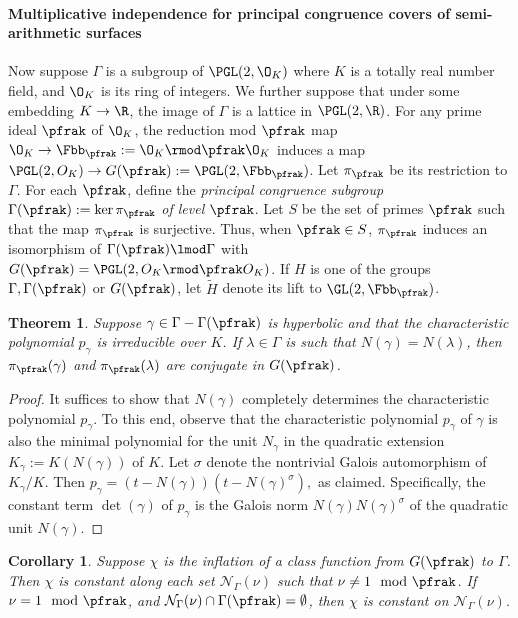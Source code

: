 \documentclass[11pt]{amsart}
\theoremstyle{definition}
\theoremstyle{plain}
\newtheorem{thm}{Theorem}
\newtheorem{corollary}{Corollary}
\theoremstyle{remark}
\begin{document}
\paragraph{Multiplicative independence for principal congruence covers of semi-arithmetic surfaces}

Now suppose $\Gamma$ is a subgroup of $\PGL(2,\O_K)$  where $K$ is a totally real number field, and $\O_K$ is its ring of integers.
We further suppose that under some embedding $K\to \R$, the image of $\Gamma$ is a lattice in $\PGL(2,\R)$.
For any prime ideal $\pfrak$ of $\O_K$, the reduction mod $\pfrak$ map $\O_K \to \Fbb_\pfrak:=\O_K \rmod \pfrak \O_K$ induces a map $\PGL(2,O_K)\to G(\pfrak):=\PGL(2,\Fbb_\pfrak)$.
Let $\pi_\pfrak$ be its restriction to $\Gamma$.
For each $\pfrak$, define the \emph{principal congruence subgroup}  $\Gamma(\pfrak) := \ker \pi_\pfrak$ \emph{of level $\pfrak$}.
Let $S$ be the set of primes $\pfrak$ such that the map $\pi_\pfrak$ is surjective.
Thus, when $\pfrak \in S$, $\pi_\pfrak$ induces an isomorphism of $\Gamma(\pfrak) \lmod \Gamma$ with $G(\pfrak)=\PGL(2,O_K\rmod \pfrak O_K)$.
If $H$ is one of the groups $\Gamma,\Gamma(\pfrak)$ or $G(\pfrak)$, let $\tilde{H}$ denote its lift to $\GL(2,\Fbb_{\pfrak})$.


\begin{thm}
	Suppose $\gamma\in \Gamma - \Gamma(\pfrak)$ is hyperbolic and that the characteristic polynomial $p_{\gamma}$ is irreducible over $K$.
	If $\lambda \in \Gamma$ is such that $N(\gamma)=N(\lambda)$, then $\pi_{\pfrak}(\gamma)$ and $\pi_{\pfrak}(\lambda)$ are conjugate in $G(\pfrak)$.
\end{thm}

\begin{proof}
	It suffices to show that $N(\gamma)$ completely determines the characteristic polynomial $p_{\gamma}$.
	To this end, observe that the characteristic polynomial $p_{\gamma}$ of $\gamma$ is also the minimal polynomial for the unit $N_{\gamma}$ in the quadratic extension $K_{\gamma}:= K(N(\gamma))$ of $K$.
	Let $\sigma$ denote the nontrivial Galois automorphism of $K_{\gamma}/K$.
	Then $p_{\gamma}=(t-N(\gamma))(t-N(\gamma)^{\sigma}),$ as claimed.
	Specifically, the constant term $\det(\gamma)$ of $p_{\gamma}$ is the Galois norm $N(\gamma)N(\gamma)^{\sigma}$ of the quadratic unit $N(\gamma)$.
\end{proof}

\begin{corollary}
	Suppose $\chi$ is the inflation of a class function from $G(\pfrak)$ to $\Gamma$.
	Then $\chi$ is constant along each set $\mathcal{N}_{\Gamma}(\nu)$ such that $\nu \neq 1 \mod \pfrak$.
	If $\nu=1 \mod \pfrak$,  and $\mathcal{N}_{\Gamma}(\nu)\cap \Gamma(\pfrak)= \emptyset$, then $\chi$ is constant on $\mathcal{N}_{\Gamma}(\nu)$.
\end{corollary}
\end{document}
